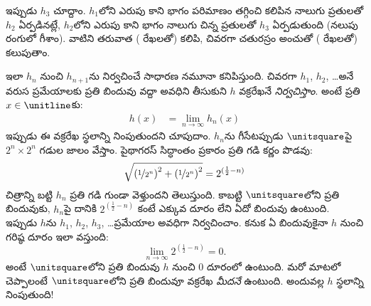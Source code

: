 \documentclass[../../../include/open-logic-section]{subfiles}
\begin{document}
ఇప్పుడు $h_3$ చూద్దాం. $h_1$లోని ఎరుపు కాని భాగం పరిమాణం తగ్గించి కలిపిన నాలుగు ప్రతులతో $h_2$ ఏర్పడినట్లే, $h_2$లోని ఎరుపు కాని భాగం నాలుగు చిన్న ప్రతులతో $h_3$ ఏర్పడుతుంది (నలుపు రంగులో గీశాం). వాటిని తరువాత ( రేఖలతో) కలిపి, చివరగా చతురస్రం అంచుతో ( రేఖలతో) కలుపుతాం.
\begin{center}
\end{center}
ఇలా $h_n$ నుంచి $h_{n+1}$ను నిర్వచించే సాధారణ నమూనా కనిపిస్తుంది. చివరగా $h_1$, $h_2$, \dots\@ అనే వరుస ప్రమేయాలకు ప్రతి బిందువు వద్దా అవధిని తీసుకుని $h$ వక్రరేఖనే \emph{నిర్వచిస్తాం}. అంటే ప్రతి $x \in \unitline$కు:
\begin{align*}
	h(x) &= \lim_{n \rightarrow \infty} h_n(x)
\end{align*}
%
ఇప్పుడు ఈ వక్రరేఖ స్థలాన్ని నింపుతుందని చూపుదాం. $h_n$ను గీసేటప్పుడు $\unitsquare$పై $2^n \times 2^n$ గడుల జాలం వేస్తాం. పైథాగరస్ సిద్ధాంతం ప్రకారం ప్రతి గడి కర్ణం పొడవు:
\[
\sqrt{\left(\nicefrac{1}{2^{n}}\right)^2+\left(\nicefrac{1}{2^{n}}\right)^2} = 2^{(\frac{1}{2}-n)}
\]
చిత్రాన్ని బట్టి $h_n$ ప్రతి గడి గుండా వెళ్తుందని తెలుస్తుంది. కాబట్టి $\unitsquare$లోని ప్రతి బిందువుకు, $h_n$పై దానికి $2^{(\frac{1}{2}-n)}$ కంటే ఎక్కువ దూరం లేని ఏదో బిందువు ఉంటుంది. ఇప్పుడు $h$ను $h_1$, $h_2$, $h_3$, \dots\@ ప్రమేయాల అవధిగా నిర్వచించాం. కనుక ఏ బిందువుకైనా $h$ నుంచి గరిష్ఠ దూరం ఇలా వస్తుంది:
\[
\lim_{n \rightarrow \infty} 2^{(\frac{1}{2}-n)} = 0.
\]
అంటే $\unitsquare$లోని ప్రతి బిందువు $h$ నుంచి $0$ దూరంలో ఉంటుంది. మరో మాటలో చెప్పాలంటే $\unitsquare$లోని ప్రతి బిందువూ వక్రరేఖ \emph{మీదనే} ఉంటుంది. అందువల్ల $h$ స్థలాన్ని నింపుతుంది!{}
%
\end{document}
